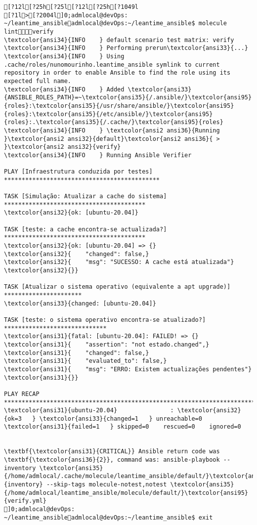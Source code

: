 \documentclass{scrartcl}
\begin{document}
\begin{Verbatim}
[?12l[?25h[?25l[?12l[?25h[?1049l
[?1l>[?2004l]0;admlocal@devOps: ~/leantime_ansibleadmlocal@devOps:~/leantime_ansible$ molecule lintverify
\textcolor{ansi34}{INFO    } default scenario test matrix: verify
\textcolor{ansi34}{INFO    } Performing prerun\textcolor{ansi33}{...}
\textcolor{ansi34}{INFO    } Using .cache/roles/nunomourinho.leantime_ansible symlink to current repository in order to enable Ansible to find the role using its expected full name.
\textcolor{ansi34}{INFO    } Added \textcolor{ansi33}{ANSIBLE_ROLES_PATH}=~\textcolor{ansi35}{/.ansible/}\textcolor{ansi95}{roles}:\textcolor{ansi35}{/usr/share/ansible/}\textcolor{ansi95}{roles}:\textcolor{ansi35}{/etc/ansible/}\textcolor{ansi95}{roles}:.\textcolor{ansi35}{/.cache/}\textcolor{ansi95}{roles}
\textcolor{ansi34}{INFO    } \textcolor{ansi2 ansi36}{Running }\textcolor{ansi2 ansi32}{default}\textcolor{ansi2 ansi36}{ > }\textcolor{ansi2 ansi32}{verify}
\textcolor{ansi34}{INFO    } Running Ansible Verifier

PLAY [Infraestrutura conduzida por testes] ********************************************

TASK [Simulação: Atualizar a cache do sistema] ****************************************
\textcolor{ansi32}{ok: [ubuntu-20.04]}

TASK [teste: a cache encontra-se actualizada?] ****************************************
\textcolor{ansi32}{ok: [ubuntu-20.04] => {}
\textcolor{ansi32}{    "changed": false,}
\textcolor{ansi32}{    "msg": "SUCESSO: A cache está atualizada"}
\textcolor{ansi32}{}}

TASK [Atualizar o sistema operativo (equivalente a apt upgrade)] **********************
\textcolor{ansi33}{changed: [ubuntu-20.04]}

TASK [teste: o sistema operativo encontra-se atualizado?] *****************************
\textcolor{ansi31}{fatal: [ubuntu-20.04]: FAILED! => {}
\textcolor{ansi31}{    "assertion": "not estado.changed",}
\textcolor{ansi31}{    "changed": false,}
\textcolor{ansi31}{    "evaluated_to": false,}
\textcolor{ansi31}{    "msg": "ERRO: Existem actualizações pendentes"}
\textcolor{ansi31}{}}

PLAY RECAP ****************************************************************************
\textcolor{ansi31}{ubuntu-20.04}               : \textcolor{ansi32}{ok=3   } \textcolor{ansi33}{changed=1   } unreachable=0    \textcolor{ansi31}{failed=1   } skipped=0    rescued=0    ignored=0


\textbf{\textcolor{ansi31}{CRITICAL}} Ansible return code was \textbf{\textcolor{ansi36}{2}}, command was: ansible-playbook --inventory \textcolor{ansi35}{/home/admlocal/.cache/molecule/leantime_ansible/default/}\textcolor{ansi95}{inventory} --skip-tags molecule-notest,notest \textcolor{ansi35}{/home/admlocal/leantime_ansible/molecule/default/}\textcolor{ansi95}{verify.yml}
]0;admlocal@devOps: ~/leantime_ansibleadmlocal@devOps:~/leantime_ansible$ exit

\end{Verbatim}
\end{document}
